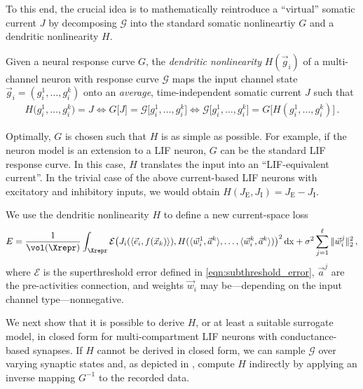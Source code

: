 To this end, the crucial idea is to mathematically reintroduce a \enquote{virtual} somatic current $J$ by decomposing $\mathscr{G}$ into the standard somatic nonlineartiy $G$ and a dendritic nonlinearity $H$.

\begin{definition}
\label{def:dendritic_nonlinearity}
Given a neural response curve $G$, the \emph{dendritic nonlinearity} $H(\vec g_i)$ of a multi-channel neuron with response curve $\mathscr{G}$ maps the input channel state $\vec g_i = (g^1_i, \ldots, g^k_i)$ onto an \emph{average}, time-independent somatic current $J$ such that
\begin{align}
		H\big(g^1_i, \ldots, g^k_i\big) = J
	\Leftrightarrow
		G\big[J\big] = \mathscr{G}\big[g^1_i, \ldots, g^k_i\big] 
	\Leftrightarrow
		\mathscr{G}\big[g^1_i, \ldots, g^k_i\big] = G\big[H(g^1_i, \ldots, g^k_i)\big] \,.
	\label{eqn:def_h}
\end{align}
\end{definition}
Optimally, $G$ is chosen such that $H$ is as simple as possible.
For example, if the neuron model is an extension to a LIF neuron, $G$ can be the standard LIF response curve.
In this case, $H$ translates the input into an \enquote{LIF-equivalent current}.
In the trivial case of the above current-based LIF neurons with excitatory and inhibitory inputs, we would obtain $H(J_\mathrm{E}, J_\mathrm{I}) = J_\mathrm{E} - J_\mathrm{I}$.

We use the dendritic nonlinearity $H$ to define a new current-space loss
\begin{align}
	E = \frac{1}{\vol(\Xrepr)} \int_{\Xrepr}
		\mathcal{E} \bigl(
			J_i(\langle \vec e_i, f(\vec x_k) \rangle),
			H(\langle \vec w^1_i, \vec a^k \rangle, \ldots, \langle \vec w^k_i, \vec a^k \rangle)
		\bigr)^2 \,\mathrm{dx} + \sigma^2 \sum_{j = 1}^\ell \| \vec w^j_i \|_2^2\,,
\label{eqn:decode_nonlinear_synapses}
\end{align}
where $\mathcal{E}$ is the superthreshold error defined in \cref{eqn:subthreshold_error}, $\vec a^j$ are the pre-activities connection, and weights $\vec w_i$ may be---depending on the input channel type---nonnegative.

We next show that it is possible to derive $H$, or at least a suitable surrogate model, in closed form for multi-compartment LIF neurons with conductance-based synapses.
If $H$ cannot be derived in closed form, we can sample $\mathscr{G}$ over varying synaptic states and, as depicted in , compute $H$ indirectly by applying an inverse mapping $G^{-1}$ to the recorded data.


